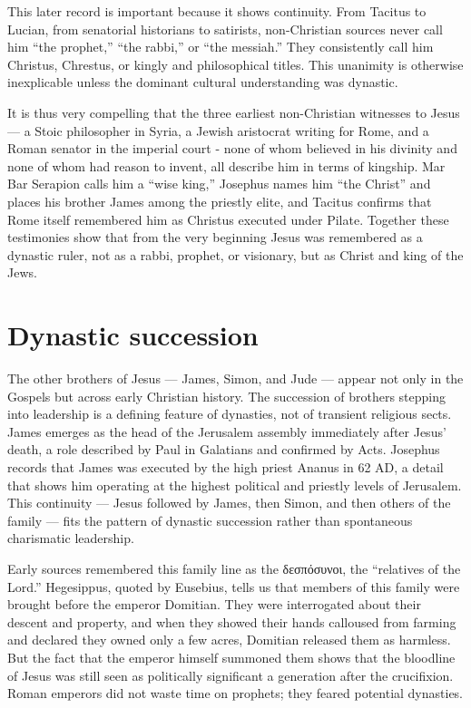 This later record is important because it shows continuity.
From Tacitus to Lucian, from senatorial historians to satirists, non-Christian sources never call him “the prophet,” “the rabbi,” or “the messiah.”
They consistently call him Christus, Chrestus, or kingly and philosophical titles.
This unanimity is otherwise inexplicable unless the dominant cultural understanding was dynastic.

It is thus very compelling that the three earliest non-Christian witnesses to Jesus — a Stoic philosopher in Syria, a Jewish aristocrat writing for Rome, and a Roman senator in the imperial court - none of whom believed in his divinity and none of whom had reason to invent, all describe him in terms of kingship.
Mar Bar Serapion calls him a “wise king,” Josephus names him “the Christ” and places his brother James among the priestly elite, and Tacitus confirms that Rome itself remembered him as Christus executed under Pilate.
Together these testimonies show that from the very beginning Jesus was remembered as a dynastic ruler, not as a rabbi, prophet, or visionary, but as Christ and king of the Jews.

\section{Dynastic succession}\label{sec:dynastic-succession}

The other brothers of Jesus — James, Simon, and Jude — appear not only in the Gospels but across early Christian history.
The succession of brothers stepping into leadership is a defining feature of dynasties, not of transient religious sects.
James emerges as the head of the Jerusalem assembly immediately after Jesus’ death, a role described by Paul in Galatians and confirmed by Acts.
Josephus records that James was executed by the high priest Ananus in 62 AD, a detail that shows him operating at the highest political and priestly levels of Jerusalem.
This continuity — Jesus followed by James, then Simon, and then others of the family — fits the pattern of dynastic succession rather than spontaneous charismatic leadership.

Early sources remembered this family line as the δεσπόσυνοι, the “relatives of the Lord.”
Hegesippus, quoted by Eusebius, tells us that members of this family were brought before the emperor Domitian.
They were interrogated about their descent and property, and when they showed their hands calloused from farming and declared they owned only a few acres, Domitian released them as harmless.
But the fact that the emperor himself summoned them shows that the bloodline of Jesus was still seen as politically significant a generation after the crucifixion.
Roman emperors did not waste time on prophets; they feared potential dynasties.

